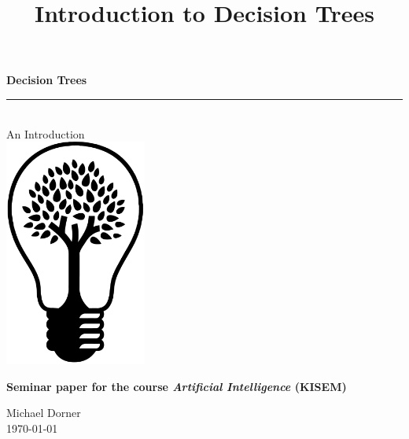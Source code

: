 






%

\title{Introduction to Decision Trees}



\begin{titlepage} 
\thispagestyle{empty}



\begin{center}
    {\fontsize{60}{60} \bfseries \textsf{Decision Trees}}\\[1em]
        
    \noindent\rule{\textwidth}{0.5pt} \\[1em]
    {\Large \textsf{An Introduction} } \\[4em]
    
    \includegraphics[width=0.35\textwidth]{content/decisiontree}
    
    \vspace{5em}

    {\sffamily \large \bfseries  Seminar paper for the course \textit{Artificial Intelligence} (KISEM)}\\[3em]


    {  \normalsize 
        Michael Dorner \\[2em]
        
        \today

    } 
\end{center}

\end{titlepage}


